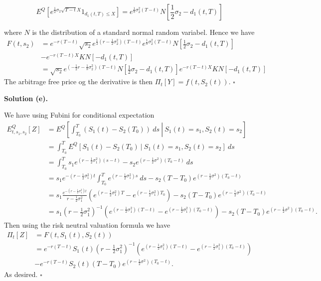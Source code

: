 \documentclass[a4paper,12pt,openany]{book}
\begin{document}
\[
E^Q\left[e^{\frac{1}{2}\sigma_2\sqrt{T-t}X}1_{d_1(t,T)\le X}\right]=e^{\frac{1}{8}\sigma_2^2(T-t)}N\left[\frac{1}{2}\sigma_2-d_1(t,T)\right]
\]

where \(N\) is the distribution of a standard normal random variabel. Hence we have
\begin{align*}
F(t,s_2)&=e^{-r(T-t)}\sqrt{s_2}e^{\frac{1}{2}\left(r-\frac{1}{2}\sigma_2^2\right)(T-t)}e^{\frac{1}{8}\sigma_2^2(T-t)}N\left[\frac{1}{2}\sigma_2-d_1(t,T)\right]\\
&-e^{-r(T-t)X}KN\left[-d_1(t,T)\right]\\
&=\sqrt{s_2}e^{\left(-\frac{1}{2}r-\frac{1}{8}\sigma_2^2\right)(T-t)}N\left[\frac{1}{2}\sigma_2-d_1(t,T)\right]e^{-r(T-t)X}KN\left[-d_1(t,T)\right]
\end{align*}
The arbitrage free price og the derivative is then \(\Pi_t[Y]=f(t,S_2(t))\). \(\square\)

\noindent\makebox[\linewidth]{\rule{\textwidth}{0.4pt}}

\textbf{Solution (e).}

We have using Fubini for conditional expectation
\begin{align*}
E^Q_{t,s_1,s_2}\left[Z\right]&=E^Q\left[\left.\int_{T_0}^T(S_1(t)-S_2(T_0))\ ds \ \right\vert\ S_1(t)=s_1,S_2(t)=s_2\right]\\
&=\int_{T_0}^TE^Q\left[\left.S_1(t)-S_2(T_0) \ \right\vert\ S_1(t)=s_1,S_2(t)=s_2\right]\ ds\\
&=\int_{T_0}^T s_1e^{\left(r-\frac{1}{2}\sigma_1^2\right)(s-t)} -s_2e^{\left(r-\frac{1}{2}\sigma^2\right)(T_0-t)} \ ds\\
&=s_1e^{-\left(r-\frac{1}{2}\sigma_1^2\right)t}\int_{T_0}^T e^{\left(r-\frac{1}{2}\sigma_1^2\right)s}\ ds-s_2(T-T_0)e^{\left(r-\frac{1}{2}\sigma^2\right)(T_0-t)}\\
&=s_1\frac{e^{-\left(r-\frac{1}{2}\sigma_1^2\right)t}}{r-\frac{1}{2}\sigma_1^2}\left( e^{\left(r-\frac{1}{2}\sigma_1^2\right)T}- e^{\left(r-\frac{1}{2}\sigma_1^2\right)T_0}\right)-s_2(T-T_0)e^{\left(r-\frac{1}{2}\sigma^2\right)(T_0-t)}\\
&=s_1\left(r-\frac{1}{2}\sigma_1^2\right)^{-1}\left( e^{\left(r-\frac{1}{2}\sigma_1^2\right)(T-t)}- e^{\left(r-\frac{1}{2}\sigma_1^2\right)(T_0-t)}\right)-s_2(T-T_0)e^{\left(r-\frac{1}{2}\sigma^2\right)(T_0-t)}.
\end{align*}
Then using the risk neutral valuation formula we have
\begin{align*}
\Pi_t[Z]&=F(t,S_1(t),S_2(t))\\
&=e^{-r(T-t)}S_1(t)\left(r-\frac{1}{2}\sigma_1^2\right)^{-1}\left( e^{\left(r-\frac{1}{2}\sigma_1^2\right)(T-t)}- e^{\left(r-\frac{1}{2}\sigma_1^2\right)(T_0-t)}\right)\\
&-e^{-r(T-t)}S_2(t)(T-T_0)e^{\left(r-\frac{1}{2}\sigma^2\right)(T_0-t)}.
\end{align*}
As desired. \(\square\)
\end{document}
